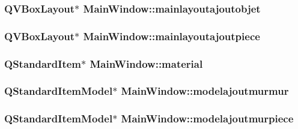 \hypertarget{class_main_window_a522646401a64c4ee90625f634f33305f}{
\subsubsection[{mainlayoutajoutobjet}]{\setlength{\rightskip}{0pt plus 5cm}Q\+V\+Box\+Layout$\ast$ Main\+Window\+::mainlayoutajoutobjet\hspace{0.3cm}{\ttfamily [private]}}}\label{class_main_window_a522646401a64c4ee90625f634f33305f}
\hypertarget{class_main_window_a9c7efc08e16b1648f53664b98dc99c00}{
\subsubsection[{mainlayoutajoutpiece}]{\setlength{\rightskip}{0pt plus 5cm}Q\+V\+Box\+Layout$\ast$ Main\+Window\+::mainlayoutajoutpiece\hspace{0.3cm}{\ttfamily [private]}}}\label{class_main_window_a9c7efc08e16b1648f53664b98dc99c00}
\hypertarget{class_main_window_ad89e3c0f75025021cddb58c4cdd5edd8}{
\subsubsection[{material}]{\setlength{\rightskip}{0pt plus 5cm}Q\+Standard\+Item$\ast$ Main\+Window\+::material\hspace{0.3cm}{\ttfamily [private]}}}\label{class_main_window_ad89e3c0f75025021cddb58c4cdd5edd8}
\hypertarget{class_main_window_acd367909c8521374eb653c45461cc156}{
\subsubsection[{modelajoutmurmur}]{\setlength{\rightskip}{0pt plus 5cm}Q\+Standard\+Item\+Model$\ast$ Main\+Window\+::modelajoutmurmur\hspace{0.3cm}{\ttfamily [private]}}}\label{class_main_window_acd367909c8521374eb653c45461cc156}
\hypertarget{class_main_window_a9e0fb8f99860fbcbdb1058e3118ed73a}{
\subsubsection[{modelajoutmurpiece}]{\setlength{\rightskip}{0pt plus 5cm}Q\+Standard\+Item\+Model$\ast$ Main\+Window\+::modelajoutmurpiece\hspace{0.3cm}{\ttfamily [private]}}}\label{class_main_window_a9e0fb8f99860fbcbdb1058e3118ed73a}
